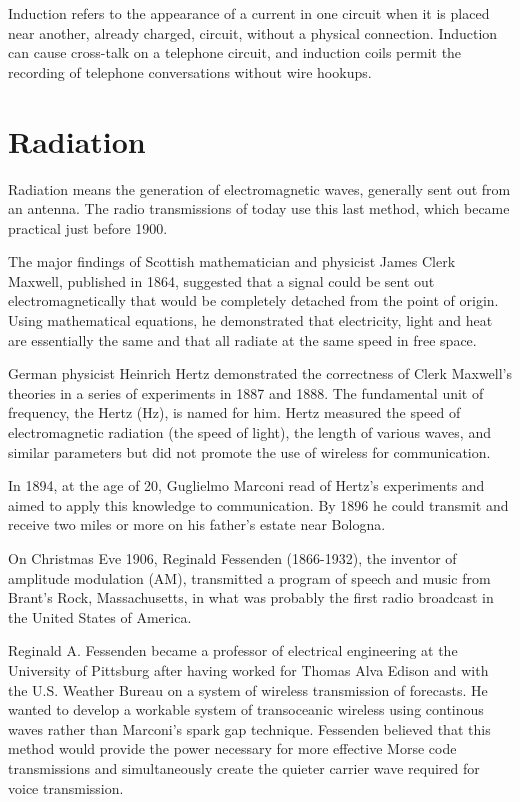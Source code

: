 \documentclass[a4paper,norsk,utf8]{report}
\begin{document}
    Induction refers to the appearance of a current in one circuit
    when it is placed near another, already charged, circuit, without
    a physical connection.
    Induction can cause cross-talk on a telephone circuit, and induction
    coils permit the recording of telephone conversations without wire
    hookups.

\section{Radiation}

    Radiation means the generation of electromagnetic waves, generally
    sent out from an antenna.   The radio transmissions of today use
    this last method, which became practical just before 1900.

    The major findings of Scottish mathematician and physicist James
    Clerk Maxwell, published in 1864, suggested that a signal could
    be sent out electromagnetically that would be completely detached
    from the point of origin.  Using mathematical equations, he
    demonstrated that electricity, light and heat are essentially
    the same and that all radiate at the same speed in free space.

    German physicist Heinrich Hertz demonstrated the correctness of
    Clerk Maxwell's theories in a series of experiments in 1887 and
    1888.  The fundamental unit of frequency, the Hertz (Hz), is named
    for him.  Hertz measured the speed of electromagnetic radiation (the
    speed of light), the length of various waves, and similar parameters
    but did not promote the use of wireless for communication.

    In 1894, at the age of 20, Guglielmo Marconi read of Hertz's
    experiments and aimed to apply this knowledge to communication.
    By 1896 he could transmit and receive two miles or more on his father's
    estate near Bologna.

    On Christmas Eve 1906, Reginald Fessenden (1866-1932), the inventor of
    amplitude modulation (AM), transmitted a program of speech and music
    from Brant's Rock, Massachusetts, in what was probably the first
    radio broadcast in the United States of America.

    Reginald A. Fessenden became a professor of electrical engineering at the
    University of Pittsburg after having worked for Thomas Alva Edison and with the
    U.S. Weather Bureau on a system of wireless transmission of forecasts.
    He wanted to develop a workable system of transoceanic wireless using
    continous waves rather than Marconi's spark gap technique.  Fessenden
    believed that this method would provide the power necessary for more
    effective Morse code transmissions and simultaneously create the quieter
    carrier wave required for voice transmission.
\end{document}

